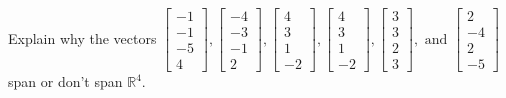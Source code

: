 \documentclass{article}
\begin{document}
\begin{exerciseStatement}
    Explain why the vectors \(\left[\begin{array}{r}
-1 \\
-1 \\
-5 \\
4
\end{array}\right] , \left[\begin{array}{r}
-4 \\
-3 \\
-1 \\
2
\end{array}\right] , \left[\begin{array}{r}
4 \\
3 \\
1 \\
-2
\end{array}\right] , \left[\begin{array}{r}
4 \\
3 \\
1 \\
-2
\end{array}\right] , \left[\begin{array}{r}
3 \\
3 \\
2 \\
3
\end{array}\right] , \text{ and } \left[\begin{array}{r}
2 \\
-4 \\
2 \\
-5
\end{array}\right]\) span or don't span \(\mathbb{R}^4\).



  
\end{exerciseStatement}
\end{document}
